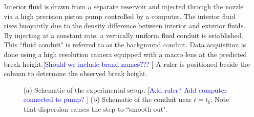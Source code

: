 \documentclass{jfm}
\newcommand{\MM}[1]{[\textcolor{blue}{#1 }]}
\begin{document}
Interior fluid is drawn from a separate reservoir and injected through the nozzle via a high precision piston pump controlled by a computer. 
The interior fluid rises buoyantly due to the density difference between interior and exterior fluids. By injecting at a constant rate, a vertically uniform fluid conduit is established. This ``fluid conduit" is referred to as the background conduit. 
Data acquisition is done using a high resolution camera equipped with a macro lens at the predicted break height.\MM{Should we include brand names???} 
A ruler is positioned beside the column to determine the observed break height. 



\begin{figure}
\centering
{}
\caption{(a) Schematic of the experimental setup. \MM{Add ruler? Add computer connected to pump?} (b) Schematic of the conduit near $t=t_b$. Note that dispersion causes the step to ``smooth out".}
\label{fig:expsys}
\end{figure}
\end{document}
